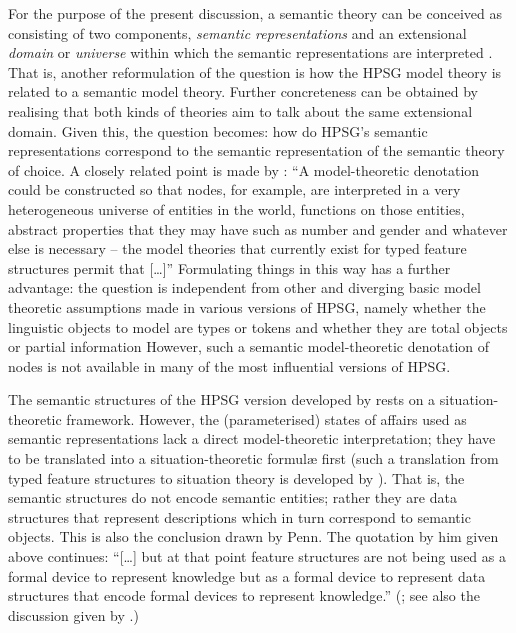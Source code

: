 \documentclass[output=paper]{langsci/langscibook}
\begin{document}
{For the purpose of the present discussion, a semantic theory can be conceived as consisting of two components, \emph{semantic representations} and an extensional \emph{domain}  or \emph{universe}  within which the semantic representations are interpreted \citep{Zimmermann:2011:a,Kempson:2011}. 
%
That is, another reformulation of the question is how the HPSG model theory is related to a semantic model theory.
%
Further concreteness can be obtained by realising that both kinds of theories aim to talk about the same extensional domain.%
%
 Given this, the question becomes:  how do HPSG's semantic representations correspond to the semantic representation of the semantic theory of choice.
%
A closely related point is made by \citet[]{Penn:2000}: \enquote{A model-theoretic denotation could be constructed so that nodes, for example, are interpreted in a very heterogeneous universe of entities in the world, functions on those entities, abstract properties that they may have such as number and gender and whatever else is necessary -- the model theories that currently exist for typed feature structures permit that [\ldots]}
%
Formulating things in  this way has a further advantage: the question is independent from other and diverging basic model theoretic assumptions made in various versions of HPSG, namely whether the linguistic objects to model are types \citep{Pollard:Sag:1994} or tokens \citep{Pollard:Sag:1987} and whether they are total objects \citep{Pollard:Sag:1994} or partial information \citep{Carpenter:1992}
%
However, such a semantic model-theoretic denotation of nodes is not available in many of the most influential versions of HPSG.


The semantic structures of the HPSG version developed by \citet{Pollard:Sag:1994} rests on a situation-theoretic framework. 
%
However, the (parameterised) states of affairs used as semantic representations lack a direct model-theoretic interpretation; they have to be translated into a situation-theoretic formul{\ae} first (such a translation from typed feature structures to situation theory is developed by \citealp{Ginzburg:Sag:2000}).
%
That is, the semantic structures do not encode semantic entities; rather they are data structures that represent descriptions which in turn correspond to semantic objects.
%
This is also the conclusion drawn by Penn.
%
The quotation by him given above continues: \enquote{[\ldots] but at that point feature structures are not being used as a formal device to represent knowledge but as a formal device to represent data structures that encode formal devices to represent knowledge.} (\citet[]{Penn:2000}; see also the discussion given by \citet[Sec.~5.2.2]{Ginzburg:2012}.)



}
\end{document}
